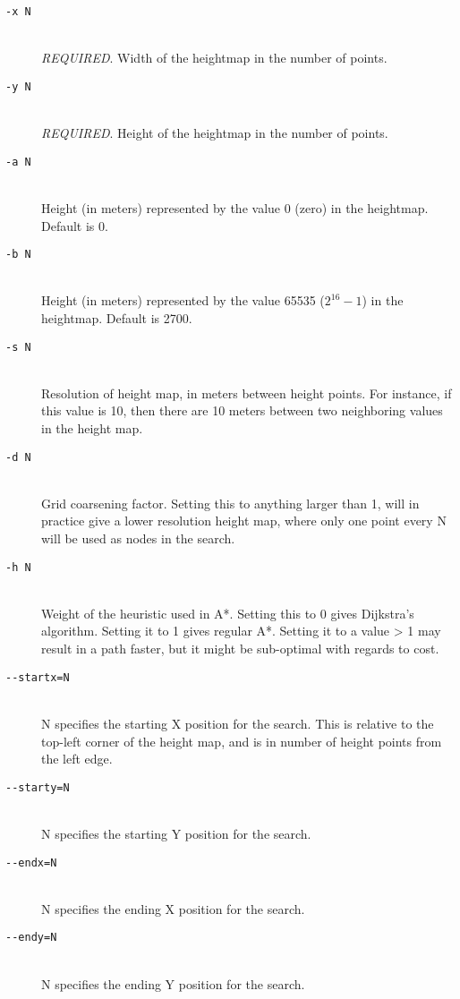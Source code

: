 \begin{description}
\item[\texttt{-x N}] \hfill \\
\textit{REQUIRED}. Width of the heightmap in the number of points. 

\item[\texttt{-y N}] \hfill \\
\textit{REQUIRED}. Height of the heightmap in the number of points. 

\item[\texttt{-a N}] \hfill \\
Height (in meters) represented by the value 0 (zero) in the heightmap. Default is 0.

\item[\texttt{-b N}] \hfill \\
Height (in meters) represented by the value 65535 ($2^{16}-1$) in the heightmap. Default is 2700.

\item[\texttt{-s N}] \hfill \\
Resolution of height map, in meters between height points. For instance, if this value is 10, then there are 10 meters between two neighboring values in the height map.

\item[\texttt{-d N}] \hfill \\
Grid coarsening factor. Setting this to anything larger than 1, will in practice give a lower resolution height map, where only one point every N will be used as nodes in the search.

\item[\texttt{-h N}] \hfill \\
Weight of the heuristic used in A*. Setting this to 0 gives Dijkstra's algorithm. Setting it to 1 gives regular A*. Setting it to a value > 1 may result in a path faster, but it might be sub-optimal with regards to cost.

\item[\texttt{-{-}startx=N}] \hfill \\
N specifies the starting X position for the search. This is relative to the top-left corner of the height map, and is in number of height points from the left edge.

\item[\texttt{-{-}starty=N}] \hfill \\
N specifies the starting Y position for the search. 

\item[\texttt{-{-}endx=N}] \hfill \\
N specifies the ending X position for the search. 

\item[\texttt{-{-}endy=N}] \hfill \\
N specifies the ending Y position for the search. 

\end{description}

